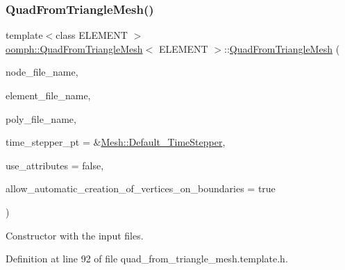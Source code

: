 \subsubsection{\texorpdfstring{Quad\+From\+Triangle\+Mesh()}{QuadFromTriangleMesh()}\hspace{0.1cm}{\footnotesize\ttfamily [2/4]}}
{\footnotesize\ttfamily template$<$class E\+L\+E\+M\+E\+NT $>$ \\
\hyperlink{classoomph_1_1QuadFromTriangleMesh}{oomph\+::\+Quad\+From\+Triangle\+Mesh}$<$ E\+L\+E\+M\+E\+NT $>$\+::\hyperlink{classoomph_1_1QuadFromTriangleMesh}{Quad\+From\+Triangle\+Mesh} (\begin{DoxyParamCaption}\item[{const std\+::string \&}]{node\+\_\+file\+\_\+name,  }\item[{const std\+::string \&}]{element\+\_\+file\+\_\+name,  }\item[{const std\+::string \&}]{poly\+\_\+file\+\_\+name,  }\item[{\hyperlink{classoomph_1_1TimeStepper}{Time\+Stepper} $\ast$}]{time\+\_\+stepper\+\_\+pt = {\ttfamily \&\hyperlink{classoomph_1_1Mesh_a12243d0fee2b1fcee729ee5a4777ea10}{Mesh\+::\+Default\+\_\+\+Time\+Stepper}},  }\item[{const bool \&}]{use\+\_\+attributes = {\ttfamily false},  }\item[{const bool \&}]{allow\+\_\+automatic\+\_\+creation\+\_\+of\+\_\+vertices\+\_\+on\+\_\+boundaries = {\ttfamily true} }\end{DoxyParamCaption})\hspace{0.3cm}{\ttfamily [inline]}}



Constructor with the input files. 



Definition at line 92 of file quad\+\_\+from\+\_\+triangle\+\_\+mesh.\+template.\+h.

\mbox{\label{classoomph_1_1QuadFromTriangleMesh_a78f9c12882d4554e4484255640b6bf51}} 
